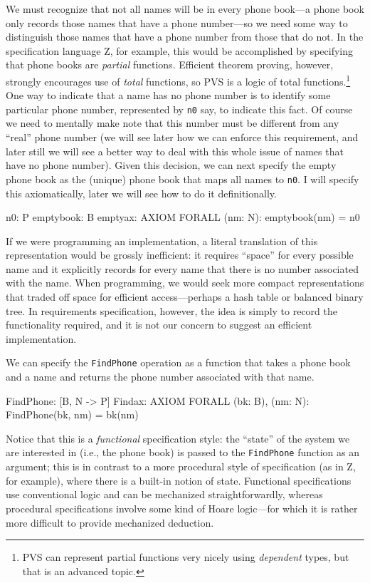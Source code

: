 We must recognize that not all names will be in every phone book---a
phone book only records those names that have a phone number---so we
need some way to distinguish those names that have a phone number from
those that do not.  In the specification language Z, for example, this
would be accomplished by specifying that phone books are {\em
partial\/} functions.  Efficient theorem proving, however, strongly
encourages use of {\em total\/} functions, so PVS is a logic of total
functions.\footnote{PVS can represent partial functions very nicely
using {\em dependent\/} types, but that is an advanced topic.}  One
way to indicate that a name has no phone number is to identify some
particular phone number, represented by {\tt n0} say, to indicate this
fact.  Of course we need to mentally make note that this number must
be different from any ``real'' phone number (we will see later how we
can enforce this requirement, and later still we will see a better way
to deal with this whole issue of names that have no phone number).  Given
this decision, we can next
specify the empty phone book as the (unique) phone book that maps all
names to {\tt n0}.  I will specify this axiomatically, later we will
see how to do it definitionally.
\begin{pvsexample}
n0: P
emptybook: B
emptyax: AXIOM   FORALL (nm: N): emptybook(nm) = n0
\end{pvsexample}
If we were programming an implementation, a literal translation of
this representation would be grossly inefficient: it requires
``space'' for every possible name and it explicitly records for every
name that there is no number associated with the name.  When
programming, we would seek more compact representations that traded
off space for efficient access---perhaps a hash table or balanced
binary tree.   In requirements specification, however, the idea is
simply to record the functionality required, and it is not our concern
to suggest an efficient implementation.

We can specify the {\tt FindPhone} operation as a function that takes a
phone book and a name and returns the phone number associated with
that name.
\begin{pvsexample}
FindPhone: [B, N -> P]
Findax: AXIOM   FORALL (bk: B), (nm: N):  FindPhone(bk, nm) = bk(nm)
\end{pvsexample}
Notice that this is a {\em functional\/} specification style: the
``state'' of the system we are interested in (i.e., the phone book) is
passed to the {\tt FindPhone} function as an argument; this is in contrast
to a more procedural style of specification (as in Z, for example),
where there is a built-in notion of state.  Functional specifications
use conventional logic and can be mechanized straightforwardly,
whereas procedural specifications involve some kind of Hoare
logic---for which it is rather more difficult to provide mechanized
deduction.

